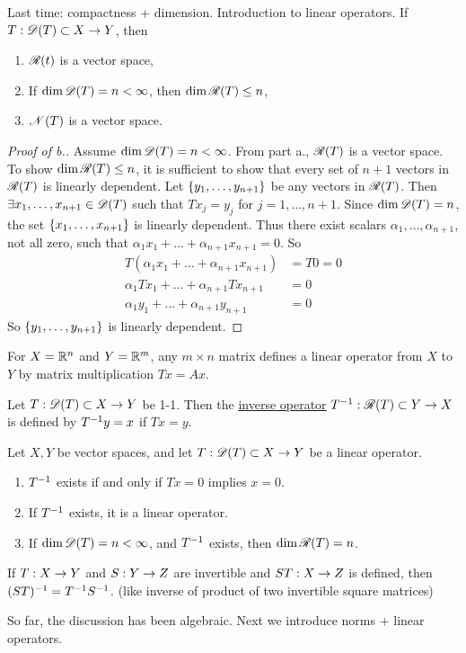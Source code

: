 \documentclass[]{article}
\begin{document}
\begin{recall}
Last time: compactness + dimension.
Introduction to linear operators.
If $T:\mathscr{D}(T)\subset X\rightarrow Y$, then
\begin{enumerate}
	\item[a.] $\mathscr{R}(t)$ is a vector space,
	\item[b.] If $\dim\mathscr{D}(T)=n<\infty$, then $\dim\mathscr{R}(T)\leq n$,
	\item[c.] $\mathscr{N}(T)$ is a vector space.
\end{enumerate}
\end{recall}
\begin{proof}
	[Proof of b.]
	Assume $\dim\mathscr{D}(T)=n<\infty$.
	From part a., $\mathscr{R}(T)$ is a vector space.
	To show $\dim\mathscr{R}(T)\leq n$,
	it is sufficient to show that every set of $n+1$ vectors in $\mathscr{R}(T)$ is linearly dependent.
	Let $\left\{ y_1,\dots,y_{n+1} \right\}$ be any vectors in $\mathscr{R}(T)$.
	Then $\exists x_1,\dots,x_{n+1}\in\mathscr{D}(T)$ such that $Tx_j = y_j$ for $j=1,\dots,n+1$.
	Since $\dim\mathscr{D}(T) = n$, the set $\left\{ x_1,\dots,x_{n+1} \right\}$ is linearly dependent.
	Thus there exist scalars $\alpha_1,\dots,\alpha_{n+1}$, not all zero, such that $\alpha_1x_1+\dots+\alpha_{n+1}x_{n+1} = 0$.
	So 
	\begin{align*}
		T(\alpha_1x_1+\dots+\alpha_{n+1}x_{n+1}) &= T0 = 0 \\
		\alpha_1Tx_1 +\dots+ \alpha_{n+1}Tx_{n+1} &= 0 \\
		\alpha_1y_1 + \dots + \alpha_{n+1}y_{n+1} &= 0
	\end{align*}
	So $\left\{ y_1,\dots,y_{n+1} \right\}$ is linearly dependent.
\end{proof}

\begin{example}
	For $X=\mathbb{R}^n$ and $Y=\mathbb{R}^m$, any $m\times n$ matrix defines a linear operator from $X$ to $Y$ by matrix multiplication $Tx=Ax$.
\end{example}
\begin{definition}
	Let $T:\mathscr{D}(T)\subset X\rightarrow Y$ be 1-1.
	Then the \ul{inverse operator} $T^{-1}:\mathscr{R}(T)\subset Y\rightarrow X$ is defined by $T^{-1} y=x$ if $Tx=y$.
\end{definition}
\begin{theorem}
	Let $X,Y$ be vector spaces, and let $T:\mathscr{D}(T)\subset X\rightarrow Y$ be a linear operator.
	\begin{enumerate}
		\item[a)] $T^{-1}$ exists if and only if $Tx=0$ implies $x=0$.
		\item[b)] If $T^{-1}$ exists, it is a linear operator.
		\item[c)] If $\dim\mathscr{D}(T)=n<\infty$, and $T^{-1}$ exists, then $\dim\mathscr{R}(T)=n$.
	\end{enumerate}
\end{theorem}
\begin{note}
	If $T:X\rightarrow Y$ and $S:Y\rightarrow Z$ are invertible and $ST:X\rightarrow Z$ is defined, then $(ST)^{-1} = T^{-1} S^{-1}$.
	(like inverse of product of two invertible square matrices)
\end{note}
So far, the discussion has been algebraic.
Next we introduce norms + linear operators.
\end{document}
